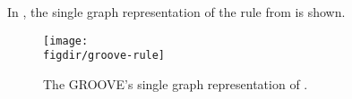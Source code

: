 In , the single graph representation of the rule from  is shown.

\begin{figure}[htp]
  \centering
  \texttt{[image: \\figdir/groove-rule]}
  \caption{The GROOVE's single graph representation of .}
\end{figure}

